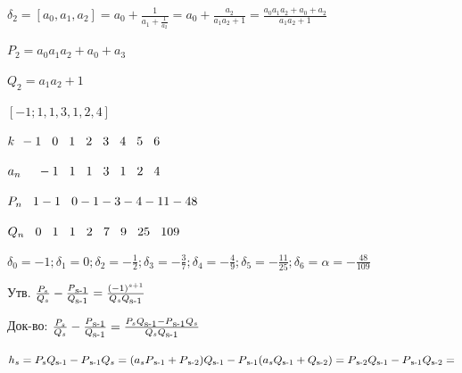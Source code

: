 \documentclass[12pt]{article}
\begin{document}
$\delta_2 = [a_0,a_1,a_2] = a_0 + \frac{1}{a_1 + \frac{1}{a_2}} = a_0 + \frac{a_2}{a_1 a_2 + 1} = \frac{a_0 a_1 a_2 + a_0 + a_2}{a_1 a_2 + 1}$

$P_2 = a_0 a_1 a_2 + a_0 + a_3$

$Q_2 = a_1 a_2 +1$

$[-1;1,1,3,1,2,4]$

$k \hspace{1 ex} -1\hspace{2 ex}0\hspace{2 ex}1\hspace{2 ex}2\hspace{2 ex}3\hspace{2 ex}4\hspace{2 ex}5\hspace{2 ex}6$

$a_n  \hspace{1 ex}\hspace{2 ex}-1\hspace{2 ex}1\hspace{2 ex}1\hspace{2 ex}3\hspace{2 ex}1\hspace{2 ex}2\hspace{2 ex}4$

$P_n \hspace{2 ex} 1-1\hspace{2 ex}0-1-3-4-11-48$

$Q_n \hspace{2 ex} 0\hspace{2 ex}1\hspace{2 ex}1\hspace{2 ex}2\hspace{2 ex}7\hspace{2 ex}9\hspace{2 ex}25\hspace{2 ex}109$

$\delta_0 = -1; \delta_1 = 0; \delta_2 = -\frac{1}{2} ;\delta_3 = -\frac{3}{7} ; \delta_4 =-\frac{4}{9} ; \delta_5 = -\frac{11}{25} ; \delta_6 = \alpha = -\frac{48}{109}$

            Утв. $\frac{P_s}{Q_s} - \frac{P\textsubscript{s-1}}{Q\textsubscript{s-1}} = \frac{(-1)^{s+1}}{Q_s Q\textsubscript{s-1}}$

            Док-во: $\frac{P_s}{Q_s} - \frac{P\textsubscript{s-1}}{Q\textsubscript{s-1}} = \frac{P_s Q\textsubscript{s-1} - P\textsubscript{s-1} Q_s}{Q_s Q\textsubscript{s-1}}$

$h_s = P_s Q\textsubscript{s-1} - P\textsubscript{s-1} Q_s = (a_s P\textsubscript{s-1} + P\textsubscript{s-2}) Q\textsubscript{s-1} - P\textsubscript{s-1}(a_s Q\textsubscript{s-1} + Q\textsubscript{s-2}) = P\textsubscript{s-2} Q\textsubscript{s-1} - P\textsubscript{s-1} Q\textsubscript{s-2} = $
\end{document}
